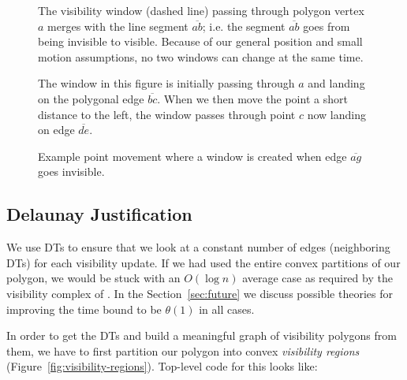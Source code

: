 \begin{figure}
  \begin{center}
    
  \end{center}
  \caption{\label{fig:window-edge-merge}
    The visibility window (dashed line) passing through polygon vertex
    $a$ merges with the line segment $\overline{ab}$; i.e. the segment
    $\overline{ab}$ goes from being invisible to visible. Because of our
    general position and small motion assumptions, no two windows can
    change at the same time.
  }
\end{figure}

\begin{figure}
  \begin{center}
    
  \end{center}
  \caption{\label{fig:window-vertex-pass}
    The window in this figure is initially passing through $a$ and
    landing on the polygonal edge $\overline{bc}$. When we then move
    the point a short distance to the left, the window passes through
    point $c$ now landing on edge $\overline{de}$.
  }
\end{figure}
  
\begin{figure}
  \begin{center}
    
  \end{center}
  \caption{\label{fig:edge-change}
    Example point movement where a window is created when edge
    $\overline{ag}$ goes invisible.
  }
\end{figure}

\subsection{Delaunay Justification} \label{sec:delaunay-justification}

We use DTs to ensure that we look at a constant number of edges
(neighboring DTs) for each visibility update. If we had
used the entire convex partitions of our polygon, we would be stuck
with an $O(\log n)$ average case as required by the visibility
complex of \cite{dynamic-visibility}. In the Section~\ref{sec:future}
we discuss possible theories for improving the time bound to be
$\theta(1)$ in all cases.

In order to get the DTs and build a meaningful graph of visibility
polygons from them, we have to first partition our polygon into
convex \emph{visibility regions} (Figure~\ref{fig:visibility-regions}).
Top-level code for this looks like:

